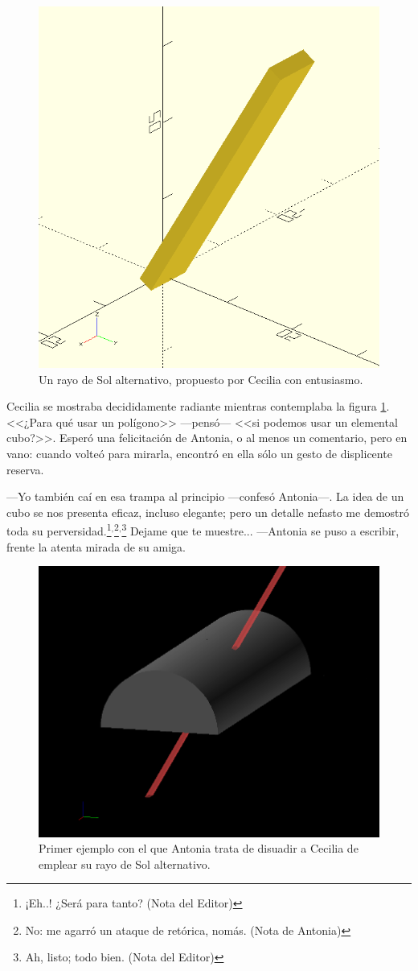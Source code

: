 \begin{figure}[ht]
  \centering
  \includegraphics[width=.5\textwidth]{imagenes/otro-rayo}
  \caption[Rayo de Sol alternativo]{Un rayo de Sol alternativo,
    propuesto por Cecilia con entusiasmo.}
  \label{fig:otro-rayo}
\end{figure}
  
Cecilia se mostraba decididamente radiante mientras contemplaba la
figura \ref{fig:otro-rayo}. <<¿Para qué usar un polígono>> \mbox{---pen}\-só---
<<si podemos usar un elemental cubo?>>. Esperó una felicitación de
Antonia, o al menos un comentario, pero en vano: cuando volteó para
mirarla, encontró en ella sólo un gesto de displicente reserva.

---Yo también caí en esa trampa al principio ---confesó
An\-to\-\mbox{nia---.} La idea de un cubo se nos presenta eficaz,
incluso elegante; pero un detalle nefasto me demostró toda su
perversidad.\footnote{¡Eh..! ¿Será para tanto? (Nota del
  Editor)}$^,$\footnote{No: me agarró un ataque de retórica,
  nomás. (Nota de Antonia)}$^,$\footnote{Ah, listo; todo bien. (Nota
  del Editor)} Dejame que te muestre... ---Antonia se puso a escribir,
frente la atenta mirada de su amiga.

\begin{figure}[h]
  \centering
    \includegraphics[width=.55\textwidth]{imagenes/otro-rayo-60}
    \caption[Rayo de Sol alternativo II]{Primer ejemplo con el que
      Antonia trata de disuadir a Cecilia de emplear su rayo de Sol
      alternativo.}
\label{fig:otro-rayo-60}
\end{figure}
  

